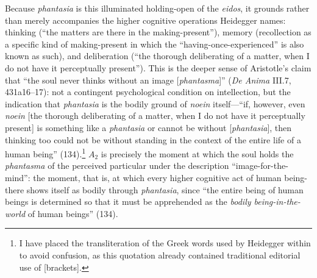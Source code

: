 Because \textit{phantasia} is this illuminated holding-open of the \textit{eidos}, it grounds rather than merely accompanies the higher cognitive operations Heidegger names: thinking (``the matters are there in the making-present''), memory (recollection as a specific kind of making-present in which the ``having-once-experienced'' is also known as such), and deliberation (``the thorough deliberating of a matter, when I do not have it perceptually present''). This is the deeper sense of Aristotle's claim that ``the soul never thinks without an image [\textit{phantasma}]'' (\textit{De Anima} III.7, 431a16–17): not a contingent psychological condition on intellection, but the indication that \textit{phantasia} is the bodily ground of \textit{noein} itself---``if, however, even  {\textit{noein}} [the thorough deliberating of a matter, when I do not have it perceptually present] is something like a  {\textit{phantasia}} or cannot be without  [\textit{phantasia}], then thinking too could not be without standing in the context of the entire life of a human being'' (134).\footnote{I have placed the transliteration of the Greek words used by Heidegger within {} to avoid confusion, as this quotation already contained traditional editorial use of [brackets].} $A_2$ is precisely the moment at which the soul holds the \textit{phantasma} of the perceived particular under the description ``image-for-the-mind'': the moment, that is, at which every higher cognitive act of human being-there shows itself as bodily through \textit{phantasia}, since ``the entire being of human beings is determined so that it must be apprehended as the \textit{bodily being-in-the-world} of human beings'' (134).

